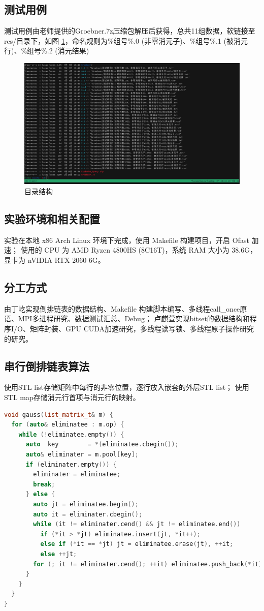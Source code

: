 \documentclass[a4paper]{article}
\begin{document}
\subsection{测试用例}
测试用例由老师提供的Groebner.7z压缩包解压后获得，总共11组数据，软链接至res/目录下，如图 \ref{pic:dir}，命名规则为\%组号\%.0 (非零消元子)、\%组号\%.1 (被消元行)、\%组号\%.2 (消元结果)
\begin{figure}
  \centering
  \includegraphics[width=1\textwidth]{dir.png}
  \caption{目录结构}
  \label{pic:dir}
\end{figure}

\subsection{实验环境和相关配置}
实验在本地 x86 Arch Linux 环境下完成，使用 Makefile 构建项目，开启 Ofast 加速；
使用的 CPU 为 AMD Ryzen 4800HS (8C16T)，系统 RAM 大小为 38.6G，显卡为 nVIDIA RTX 2060 6G。

\subsection{分工方式}
由丁屹实现倒排链表的数据结构、Makefile 构建脚本编写、多线程call\_once原语、MPI多进程研究、数据测试汇总、Debug；
卢麒萱实现bitset的数据结构和程序I/O、矩阵封装、GPU CUDA加速研究，多线程读写锁、多线程原子操作研究的研究。

\subsection{串行倒排链表算法}
使用STL list存储矩阵中每行的非零位置，逐行放入嵌套的外层STL list；
使用STL map存储消元行首项与消元行的映射。

\begin{lstlisting}[frame=trbl, language={C++}, caption={串行倒排链表消元部分}]
void gauss(list_matrix_t& m) {
  for (auto& eliminatee : m.op) {
    while (!eliminatee.empty()) {
      auto  key        = *(eliminatee.cbegin());
      auto& eliminater = m.pool[key];
      if (eliminater.empty()) {
        eliminater = eliminatee;
        break;
      } else {
        auto jt = eliminatee.begin();
        auto it = eliminater.cbegin();
        while (it != eliminater.cend() && jt != eliminatee.end())
          if (*it > *jt) eliminatee.insert(jt, *it++);
          else if (*it == *jt) jt = eliminatee.erase(jt), ++it;
          else ++jt;
        for (; it != eliminater.cend(); ++it) eliminatee.push_back(*it);
      }
    }
  }
}
\end{lstlisting}
\end{document}
